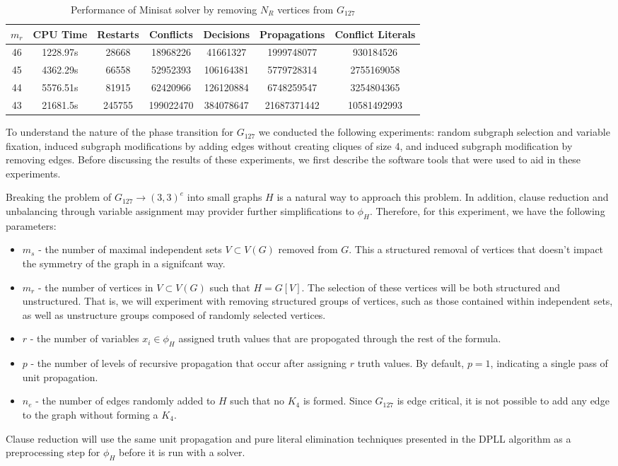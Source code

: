 \documentclass[paper=a4, fontsize=11pt]{scrartcl} %
\begin{document}
\begin{table}
	\caption{Performance of Minisat solver by removing $N_R$ vertices from $G_{127}$}
	\begin{tabular}{c | c | c | c | c | c | c}
		\hline
		$m_r$ & CPU Time & Restarts & Conflicts & Decisions & Propagations & Conflict Literals \\ \hline
		46 & 1228.97s & 28668 & 18968226 & 41661327 & 1999748077 & 930184526 \\ 
		45 & 4362.29s & 66558 & 52952393 & 106164381 & 5779728314 & 2755169058 \\ 
		44 & 5576.51s & 81915 & 62420966 & 126120884 & 6748259547 & 3254804365 \\ 
		43 & 21681.5s & 245755 & 199022470 & 384078647 & 21687371442 & 10581492993 \\ 
		\hline
	\end{tabular}
	\label{tab:performanceSat}
\end{table}

To understand the nature of the phase transition for $G_{127}$ we conducted the following
experiments: random subgraph selection and variable fixation, induced subgraph modifications
by adding edges without creating cliques of size 4, and induced subgraph modification
by removing edges. Before discussing the results of these experiments, we first describe
the software tools that were used to aid in these experiments.

Breaking the problem of $G_{127} \to (3,3)^e$ into small graphs $H$ is a natural way
to approach this problem. In addition, clause reduction and unbalancing through
variable assignment may provider further simplifications to $\phi_H$.
Therefore, for this experiment, we have the following parameters:
\begin{itemize}
	\item $m_s$ - the number of maximal independent sets $V \subset V(G)$ removed from $G$. This a structured removal of vertices that doesn't impact the symmetry of the graph in a signifcant way.
	\item $m_r$ - the number of vertices in $V \subset V(G)$ such that $H = G[V]$. The selection of
	these vertices will be both structured and unstructured. That is, we will experiment
	with removing structured groups of vertices, such as those contained within independent 
	sets, as well as unstructure groups composed of randomly selected vertices.
	\item $r$ - the number of variables $x_i \in \phi_H$ assigned truth values that are
	propogated through the rest of the formula. 
	\item $p$ - the number of levels of recursive propagation that occur after assigning 
	$r$ truth values. By default, $p = 1$, indicating a single pass of unit propagation.
	\item $n_e$ - the number of edges randomly added to $H$ such that no $K_4$ is formed. Since $G_{127}$ is edge
	critical, it is not possible to add any edge to the graph without forming a $K_4$.
\end{itemize}
Clause reduction will use the same unit propagation and pure literal elimination techniques
presented in the DPLL algorithm as a preprocessing step for $\phi_H$ before it is run with a solver.
\end{document}
